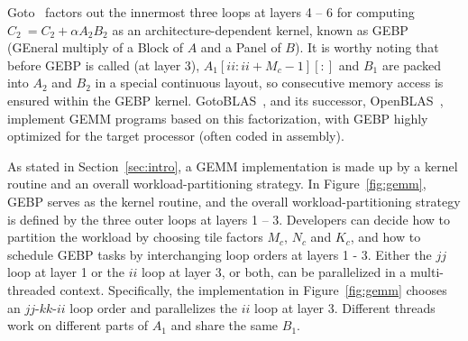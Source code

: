 Goto~\cite{gotogemm} factors out the innermost three loops at layers 4 -- 6 for
computing $C_2\ = C_2 + \alpha A_2 B_2$ as an architecture-dependent kernel,
known as  GEBP (GEneral multiply of a Block of $A$ and a Panel of $B$).
It is worthy noting that before GEBP is called (at layer 3),
$A_1[ii:ii+M_c-1][:]$ and $B_1$ are packed into $A_2$ and $B_2$
in a special continuous layout,
so consecutive memory access is ensured within the GEBP kernel.
GotoBLAS~\cite{gotoblas}, and its successor, OpenBLAS~\cite{openblas},
implement GEMM programs based on this factorization,
with GEBP highly optimized for the target processor (often coded in assembly).

As stated in Section~\ref{sec:intro}, a GEMM implementation
is made up by a kernel routine and an overall workload-partitioning strategy.
In Figure~\ref{fig:gemm}, GEBP serves as the kernel routine,
and the overall workload-partitioning strategy is defined by the three outer loops at layers 1 -- 3.
Developers can decide how to partition the workload by choosing
tile factors $M_c$, $N_c$ and $K_c$,
and how to schedule GEBP tasks by interchanging loop orders at layers 1 - 3.
Either the $jj$ loop at layer 1 or the $ii$ loop at layer 3, or both,
can be parallelized in a multi-threaded context.
Specifically, the implementation in Figure~\ref{fig:gemm}
chooses an $jj\textrm{-}kk\textrm{-}ii$ loop order
and parallelizes the $ii$ loop at layer 3.
Different threads work on different parts of $A_1$
and share the same $B_1$.

